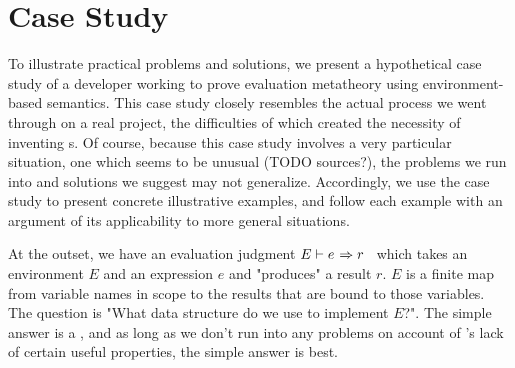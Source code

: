 \section{Case Study}
\label{sec:CaseStudy}
To illustrate practical problems and solutions, we present a hypothetical case study of a developer working to
prove evaluation metatheory using environment-based semantics. This case study closely resembles the actual process we went
through on a real project, the difficulties of which created the necessity of inventing {\dd}s. Of course,
because this case study involves a very particular situation, one which seems to be unusual (TODO sources?),
the problems we run into and solutions we suggest may not generalize. Accordingly, we use the case study to
present concrete illustrative examples, and follow each example with an argument of its applicability to more
general situations.

\newcommand{\eval}[3]{\ensuremath{{#1} \vdash {#2} \hspace{0.01in} \Rightarrow {#3}}}

At the outset, we have an evaluation judgment \eval{E}{e}{r}~ which takes an environment $E$ and an expression $e$
and "produces" a result $r$.
$E$ is a finite map from variable names in scope to the results that are bound to
those variables. The question is "What data structure do we use to implement $E$?". The simple answer is a \sal,
and as long as we don't run into any problems on account of \SAL's lack of certain useful properties, the simple
answer is best.

